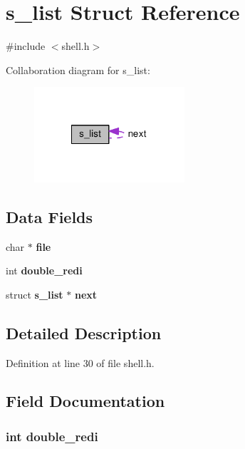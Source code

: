 \section{s\-\_\-list Struct Reference}
\label{structs__list}


{\ttfamily \#include $<$shell.\-h$>$}



Collaboration diagram for s\-\_\-list\-:\nopagebreak
\begin{figure}[H]
\begin{center}
\leavevmode
\includegraphics[width=158pt]{structs__list__coll__graph}
\end{center}
\end{figure}
\subsection*{Data Fields}
\begin{DoxyCompactItemize}
\item 
char $\ast$ {\bf file}
\item 
int {\bf double\-\_\-redi}
\item 
struct {\bf s\-\_\-list} $\ast$ {\bf next}
\end{DoxyCompactItemize}


\subsection{Detailed Description}


Definition at line 30 of file shell.\-h.



\subsection{Field Documentation}
\subsubsection[{double\-\_\-redi}]{\setlength{\rightskip}{0pt plus 5cm}int double\-\_\-redi}\label{structs__list_a47fd463223ac923d306c984fb143dfa4}


